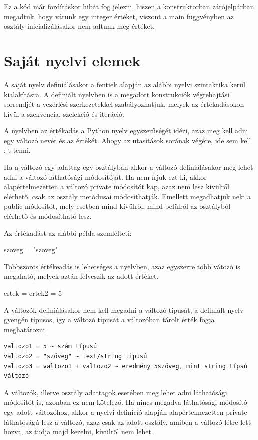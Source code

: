Ez a kód már fordításkor hibát fog jelezni, hiszen a konstruktorban zárójelpárban megadtuk, hogy várunk egy integer értéket, viszont a main függvényben az osztály inicializálásakor nem adtunk meg értéket. 
\section{Saját nyelvi elemek}
A saját nyelv definiálásakor a fentiek alapján az alábbi nyelvi szintaktika kerül kialakításra.
A definiált nyelvben is a megadott konstrukciók végrehajtási sorrendjét a vezérlési szerkezetekkel szabályozhatjuk, melyek az értékadásokon kívül a szekvencia, szelekció és iteráció.

A nyelvben az értékadás a Python nyelv egyszerűségét idézi, azaz meg kell adni egy változó nevét és az értékét. Ahogy az utasítások sorának végére, ide sem kell ;-t tenni.

Ha a változó egy adattag egy osztályban akkor a változó definiálásakor meg lehet adni a változó láthatósági módosítóját. Ha nem írjuk ezt ki, akkor alapértelmezetten a változó private módosítót kap, azaz nem lesz kívülről elérhető, csak az osztály metódusai módosíthatják. Emellett megadhatjuk neki a public módosítót, mely esetben mind kívülről, mind belülről az osztályból elérhető és módosítható lesz.

Az értékadást az alábbi példa szemlélteti:
\begin{cpp}
szoveg = "szoveg"
\end{cpp}

Többszörös értékeadás is lehetséges a nyelvben, azaz egyszerre több vátozó is megaható, melyek aztán felveszik az adott értéket.

\begin{cpp}
ertek = ertek2 = 5
\end{cpp}

A változók definiálásakor nem kell megadni a változó típusát, a definiált nyelv gyengén típusos, így a változó típusát a változóban tárolt érték fogja meghatározni.

\begin{verbatim}
valtozo1 = 5 ~ szám típusú
valtozo2 = "szöveg" ~ text/string tipusú
valtozo3 = valtozo1 + valtozo2 ~ eredmény 5szöveg, mint string típsú változó
\end{verbatim}

A változók, illetve osztály adattagok esetében meg lehet adni láthatósági módosítót is, azonban ez nem kötelező. Ha nincs megadva láthatósági módosító egy adott változóhoz, akkor a nyelvi definicíó alapján alapértelmezetten private láthatóságú lesz a változó, azaz csak az adott osztály, amiben a változó létre lett hozva, az tudja majd kezelni, kívülről nem lehet.


